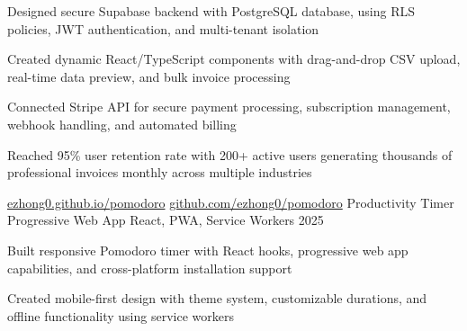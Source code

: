 \documentclass[12pt, letterpaper]{russell}
\begin{document}
\begin{cventries}
{\begin{cvitems}
        \item {Designed secure Supabase backend with PostgreSQL database, using RLS policies, JWT authentication, and multi-tenant isolation}
        \item {Created dynamic React/TypeScript components with drag-and-drop CSV upload, real-time data preview, and bulk invoice processing}
        \item {Connected Stripe API for secure payment processing, subscription management, webhook handling, and automated billing}
        \item {Reached 95\% user retention rate with 200+ active users generating thousands of professional invoices monthly across multiple industries}
      \end{cvitems}
    }
\vspace{0.2cm}
    \cvprojectinline
    {\href{https://ezhong0.github.io/pomodoro/}{ezhong0.github.io/pomodoro} \textbar{} \href{https://github.com/ezhong0/pomodoro}{github.com/ezhong0/pomodoro}} %
    {Productivity Timer Progressive Web App} %
    {React, PWA, Service Workers} %
    {2025} %
    {
      \begin{cvitems}
        \item {Built responsive Pomodoro timer with React hooks, progressive web app capabilities, and cross-platform installation support}
        \item {Created mobile-first design with theme system, customizable durations, and offline functionality using service workers}
      \end{cvitems}
    }
\end{cventries}

\end{document}
